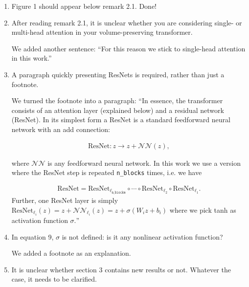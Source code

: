 \documentclass{article}
\begin{document}
\begin{enumerate}
\item Figure 1 should appear below remark 2.1.
    {\color{mred} Done!}
\item After reading remark 2.1, it is unclear whether you are considering single- or multi-head attention in your volume-preserving transformer.

    {\color{mred} We added another sentence: ``For this reason we stick to single-head attention in this work.''}
\item A paragraph quickly presenting ResNets is required, rather than just a footnote.

    {\color{mred} We turned the footnote into a paragraph:
    ``In essence, the transformer consists of an attention layer (explained below) and a residual network (ResNet). In its simplest form a ResNet is a standard feedforward neural network with an add connection:

    \begin{equation}
    \begin{split}\mathrm{ResNet}: z \rightarrow z + \mathcal{NN}(z),\end{split}\end{equation}

    where \(\mathcal{NN}\) is any feedforward neural network. In this work we use a version where the ResNet step is repeated \texttt{n\_blocks} times, i.e. we have

    \begin{equation}
    \begin{split}    \mathrm{ResNet} = \mathrm{ResNet}_{\ell_\mathtt{n\_blocks}}\circ\cdots\circ\mathrm{ResNet}_{\ell_2}\circ\mathrm{ResNet}_{\ell_1}.\end{split}\end{equation}
    Further, one ResNet layer is simply \(\mathrm{ResNet}_{\ell_i}(z) = z + \mathcal{NN}_{\ell_i}(z) = z + \sigma(W_iz + b_i)\) where we pick tanh as activation function \(\sigma.\)'' }

\item In equation 9, $\sigma$ is not defined: is it any nonlinear activation function?

        {\color{mred} We added a footnote as an explanation.}
\item It is unclear whether section 3 contains new results or not. Whatever the case, it needs to be clarified.


\end{enumerate}
\end{document}
